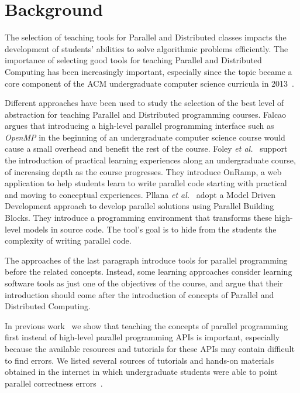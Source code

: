 \section{Background}
\label{sec:background}


The selection of teaching tools for Parallel and Distributed classes impacts
the development of students' abilities to solve algorithmic problems
efficiently. The importance of selecting good tools for teaching Parallel and
Distributed Computing has been increasingly important, especially since the
topic became a core component of the ACM undergraduate computer science
curricula in 2013~\cite{acmcurricula}.

Different approaches have been used to study the selection of the best level of
abstraction for teaching Parallel and Distributed programming courses.
Falcao~\cite{6565518} argues that introducing a high-level parallel programming
interface such as \textit{OpenMP} in the beginning of an undergraduate computer
science course would cause a small overhead and benefit the rest of the course.
Foley \textit{et al.}~\cite{FOLEY2017138} support the introduction of practical
learning experiences along an undergraduate course, of increasing depth as the
course progresses. They introduce OnRamp, a web application to help students
learn to write parallel code starting with practical and moving to conceptual
experiences.  Pllana \textit{et al.}~\cite{Pllana:2009} adopt a Model Driven
Development approach to develop parallel solutions using Parallel Building
Blocks. They introduce a programming environment that transforms these
high-level models in source code. The tool's goal is to hide from the students
the complexity of writing parallel code.

The approaches of the last paragraph introduce tools for parallel programming
before the related concepts.  Instead, some learning approaches
consider learning software tools as just one of the objectives of the course,
and argue that their introduction should come after the introduction of
concepts of Parallel and Distributed Computing.

In previous work~\cite{goncalves:OpenMPNotEasy} we show that teaching the
concepts of parallel programming first instead of high-level parallel
programming APIs is important, especially because the available resources and
tutorials for these APIs may contain difficult to find errors.  We listed
several sources of tutorials and hands-on materials obtained in the internet in
which undergraduate students were able to point parallel correctness
errors~\cite{SuB:2005:CMO:1892830.1892863}.


